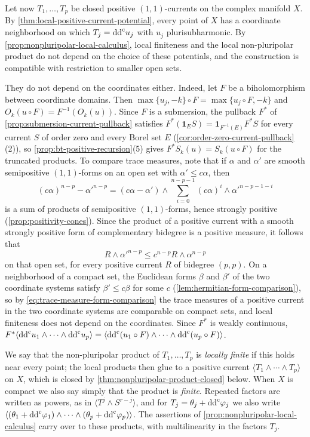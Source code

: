 Let now $T_1,\ldots,T_p$ be closed positive $(1,1)$-currents on the complex manifold $X$. By \cref{thm:local-positive-current-potential}, every point of $X$ has a coordinate neighborhood on which $T_j=\mathrm{dd}^{\mathrm{c}} u_j$ with $u_j$ plurisubharmonic. By \cref{prop:nonpluripolar-local-calculus}, local finiteness and the local non-pluripolar product do not depend on the choice of these potentials, and the construction is compatible with restriction to smaller open sets.

They do not depend on the coordinates either. Indeed, let $F$ be a biholomorphism between coordinate domains. Then $\max\{u_j,-k\}\circ F=\max\{u_j\circ F,-k\}$ and $O_k(u\circ F)=F^{-1}(O_k(u))$. Since $F$ is a submersion, the pullback $F^*$ of \cref{prop:submersion-current-pullback} satisfies $F^*(\mathbf1_ES)=\mathbf1_{F^{-1}(E)}F^*S$ for every current $S$ of order zero and every Borel set $E$ (\cref{cor:order-zero-current-pullback}(2)), so \cref{prop:bt-positive-recursion}(5) gives $F^*S_k(u)=S_k(u\circ F)$ for the truncated products. To compare trace measures, note that if $\alpha$ and $\alpha'$ are smooth semipositive $(1,1)$-forms on an open set with $\alpha'\leq c\alpha$, then
\[
 (c\alpha)^{n-p}-\alpha'^{n-p}=(c\alpha-\alpha')\wedge\sum_{i=0}^{n-p-1}(c\alpha)^i\wedge\alpha'^{n-p-1-i}
\]
is a sum of products of semipositive $(1,1)$-forms, hence strongly positive (\cref{prop:positivity-cones}). Since the product of a positive current with a smooth strongly positive form of complementary bidegree is a positive measure, it follows that
\begin{equation}\label{eq:trace-measure-form-comparison}
 R\wedge\alpha'^{n-p}\leq c^{n-p}R\wedge\alpha^{n-p}
\end{equation}
on that open set, for every positive current $R$ of bidegree $(p,p)$. On a neighborhood of a compact set, the Euclidean forms $\beta$ and $\beta'$ of the two coordinate systems satisfy $\beta'\leq c\beta$ for some $c$ (\cref{lem:hermitian-form-comparison}), so by \eqref{eq:trace-measure-form-comparison} the trace measures of a positive current in the two coordinate systems are comparable on compact sets, and local finiteness does not depend on the coordinates. Since $F^*$ is weakly continuous, $F^*\langle\mathrm{dd}^{\mathrm{c}} u_1\wedge\cdots\wedge\mathrm{dd}^{\mathrm{c}} u_p\rangle=\langle\mathrm{dd}^{\mathrm{c}}(u_1\circ F)\wedge\cdots\wedge\mathrm{dd}^{\mathrm{c}}(u_p\circ F)\rangle$.

We say that the non-pluripolar product of $T_1,\ldots,T_p$ is \emph{locally finite} if this holds near every point; the local products then glue to a positive current $\langle T_1\wedge\cdots\wedge T_p\rangle$ on $X$, which is closed by \cref{thm:nonpluripolar-product-closed} below. When $X$ is compact we also say simply that the product is \emph{finite}. Repeated factors are written as powers, as in $\langle T^j\wedge S^{r-j}\rangle$, and for $T_j=\theta_j+\mathrm{dd}^{\mathrm{c}}\varphi_j$ we also write $\langle(\theta_1+\mathrm{dd}^{\mathrm{c}}\varphi_1)\wedge\cdots\wedge(\theta_p+\mathrm{dd}^{\mathrm{c}}\varphi_p)\rangle$. The assertions of \cref{prop:nonpluripolar-local-calculus} carry over to these products, with multilinearity in the factors $T_j$.

